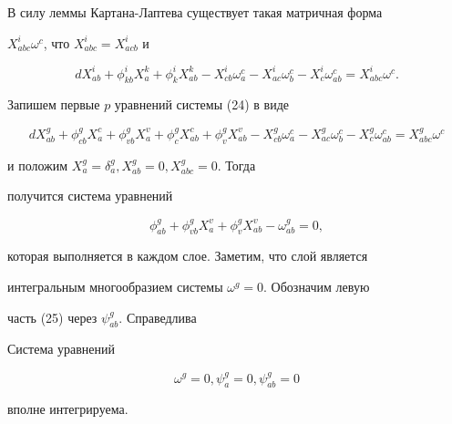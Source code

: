 В силу леммы Картана-Лаптева существует такая матричная форма


$X^i_{abc} \omega^c$, что $X^i_{abc} = X^i_{acb}$ и


\begin{equation}


dX^i_{ab} + \phi^i_{kb} X^k_a + \phi^i_k X^k_{ab} - X^i_{cb} \omega^c_a


- X^i_{ac}


\omega^c_b - X^i_c \omega^c_{ab} = X^i_{abc} \omega^c.


\end{equation}


Запишем первые $p$ уравнений системы (24) в виде


$$


dX^g_{ab} + \phi^g_{cb} X^c_a + \phi^g_{vb} X^v_a + \phi^g_c X^c_{ab} +


\phi^g_v X^v_{ab} - X^g_{cb} \omega^c_a - X^g_{ac} \omega^c_b -


X^g_c \omega^c_{ab} = X^g_{abc} \omega^c


$$


и положим $X^g_a = \delta^g_a, X^g_{ab} = 0, X^g_{abc} = 0$. Тогда


получится система уравнений


\begin{equation}


\phi^g_{ab} + \phi^g_{vb} X^v_a + \phi^g_v X^v_{ab} - \omega^g_{ab}= 0,


\end{equation}


которая выполняется в каждом слое. Заметим, что слой является


интегральным многообразием системы $\omega^g = 0$. Обозначим левую


часть (25) через $\psi^g_{ab}$. Справедлива





\begin{thm} Система уравнений


$$


\omega^g = 0, \psi^g_a = 0, \psi^g_{ab} = 0


$$


вполне интегрируема.


\end{thm}





